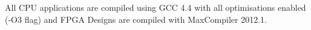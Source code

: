 All CPU applications are compiled using GCC 4.4 with all optimisations
enabled (-O3 flag) and FPGA Designs are compiled with MaxCompiler
2012.1.


\begin{comment}
  In this section we outline the design goals of the
  language, introduce an early prototype and examine its advantages and
  limitations and propose an enhanced version. We highlight the main
  features of \FAST{} and explain how these translate to components of
  dataflow designs. We analyse the major challenges we met in creating
  the \FAST{} language and highlight the strategies we adopted for
  overcoming them.


  \section{Design Goals}


  \FAST{} is used to express the simplest form of a dataflow design
  while optimisations and other transformations are encapsulated in
  aspects which are developed separately and applied through aspect
  weaving. This results in a flexible approach for generating and
  exploring the space of efficient dataflow designs.

  Designs in \FAST{} are compiled to MaxCompiler designs composed of
  inter-connected functional kernels. Communication between kernels is
  asynchronous, so they can operate independently, and compute only when
  all active inputs have available data.

  \section{Features}

  We originally developed a simple prototype of the FAST language
  sufficient to support our application benchmark
  (\Cref{sec:benchmark}). We then extended this prototype with more
  advanced features (as described in \Cref{sec:fast-extensions}) which
  were required to meet our design goals.

  In this section we use a very simple implementation of a dataflow
  kernel which is part of our Black Scholes benchmark to highlight some
  of the main features of the \FAST{} language. This kernel simply
  computes the result of the finite difference approximation solution to
  the Black Scholes Equations, iterating both in space (the fast
  dimension -- stock prices) and in time (the slow dimension). In
  \Cref{sec:fast-ref} we analyse the same example in light of our
  extensions described in \Cref{sec:fast-extensions} and argue that
  these simplify the language.


\end{comment}

